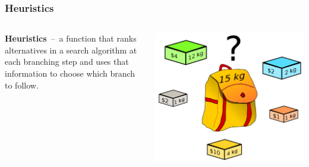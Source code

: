 \documentclass{beamer}
\begin{document}
\begin{frame}
	\frametitle{Heuristics}
	\begin{columns}
		\begin{column}{.6\textwidth}
			\textbf{Heuristics}~--~a function that ranks alternatives in a search algorithm at each branching step and uses that information to choose which branch to follow.
		\end{column}
		\begin{column}{.4\textwidth}
			\pause
			\includegraphics[height=.45\textheight]{Illustrations/knapsack.PNG}
			\\
		\end{column}
	\end{columns}
\end{frame}
\end{document}
